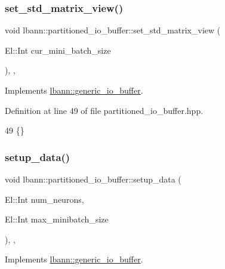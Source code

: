 \subsubsection{\texorpdfstring{set\+\_\+std\+\_\+matrix\+\_\+view()}{set\_std\_matrix\_view()}}
{\footnotesize\ttfamily void lbann\+::partitioned\+\_\+io\+\_\+buffer\+::set\+\_\+std\+\_\+matrix\+\_\+view (\begin{DoxyParamCaption}\item[{El\+::\+Int}]{cur\+\_\+mini\+\_\+batch\+\_\+size }\end{DoxyParamCaption})\hspace{0.3cm}{\ttfamily [inline]}, {\ttfamily [override]}, {\ttfamily [virtual]}}



Implements \hyperlink{classlbann_1_1generic__io__buffer_a458d9bf722effce4177a0ac0aee9124f}{lbann\+::generic\+\_\+io\+\_\+buffer}.



Definition at line 49 of file partitioned\+\_\+io\+\_\+buffer.\+hpp.


\begin{DoxyCode}
49 \{\}
\end{DoxyCode}
\mbox{\label{classlbann_1_1partitioned__io__buffer_a06a204fbf82f092b0225ab10c1bec98e}} 
\subsubsection{\texorpdfstring{setup\+\_\+data()}{setup\_data()}}
{\footnotesize\ttfamily void lbann\+::partitioned\+\_\+io\+\_\+buffer\+::setup\+\_\+data (\begin{DoxyParamCaption}\item[{El\+::\+Int}]{num\+\_\+neurons,  }\item[{El\+::\+Int}]{max\+\_\+minibatch\+\_\+size }\end{DoxyParamCaption})\hspace{0.3cm}{\ttfamily [inline]}, {\ttfamily [override]}, {\ttfamily [virtual]}}



Implements \hyperlink{classlbann_1_1generic__io__buffer_a00f3920147f7f19eceb5336bd6ddb421}{lbann\+::generic\+\_\+io\+\_\+buffer}.



